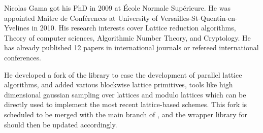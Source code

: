 \begin{participant}[PM=2,type=R,gender=male]{Nicolas Gama}
  got his PhD in 2009 at École Normale Supérieure. He was appointed Maître de
  Conférences at University of Versailles-St-Quentin-en-Yvelines in 2010.  His research
  interests cover Lattice reduction algorithms, Theory of computer sciences, Algorithmic
  Number Theory, and Cryptology. He has already published 12 papers in international
  journals or refereed international conferences.

  He developed a fork of the  library to ease the development of parallel lattice
  algorithms, and added various blockwise lattice primitives, tools like high dimensional
  gaussian sampling over lattices and modulo lattices which can be directly used to
  implement the most recent lattice-based schemes. This fork is scheduled to be merged
  with the main branch of , and the wrapper library for \Sage should then be updated
  accordingly.
\end{participant}
